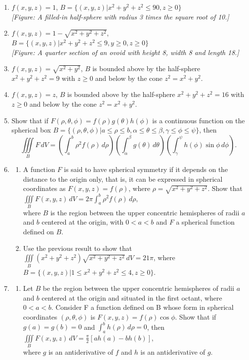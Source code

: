 \documentclass{exercises}
\begin{document}
\begin{enumerate}[resume]
\item $f(x,y,z)=1$, $B=\{(x,y,z)|x^{2}+y^{2}+z^{2}\le90,z\ge0\}$ \\ \textit{[Figure: A filled-in half-sphere with radius 3 times the square root of 10.]}
\item $f(x,y,z)=1-\sqrt{x^{2}+y^{2}+z^{2}}$, $B=\{(x,y,z)|x^{2}+y^{2}+z^{2}\le9,y\ge0,z\ge0\}$ \\ \textit{[Figure: A quarter section of an ovoid with height 8, width 8 and length 18.]}
\item $f(x,y,z)=\sqrt{x^{2}+y^{2}}$, $B$ is bounded above by the half-sphere $x^{2}+y^{2}+z^{2}=9$ with $z\ge0$ and below by the cone $z^{2}=x^{2}+y^{2}$.
\item $f(x,y,z)=z$, $B$ is bounded above by the half-sphere $x^{2}+y^{2}+z^{2}=16$ with $z\ge0$ and below by the cone $z^{2}=x^{2}+y^{2}$.
\item Show that if $F(\rho,\theta,\phi)=f(\rho)g(\theta)h(\phi)$ is a continuous function on the spherical box $B=\{(\rho,\theta,\phi)|a\le \rho \le b,\alpha \le \theta \le \beta,\gamma \le \phi \le \psi \}$, then \[\underset{B}{\iiint}F\,dV=(\int_{a}^{b}\rho^{2}f(\rho)\,d\rho)(\int_{\alpha}^{\beta}g(\theta)\,d\theta)(\int_{\gamma}^{\psi}h(\phi)\sin \phi \,d\phi).\]
\item
\begin{enumerate}[label=(\alph*)]
  \item A function $F$ is said to have spherical symmetry if it depends on the distance to the origin only, that is, it can be expressed in spherical coordinates as $F(x,y,z)=f(\rho)$, where $\rho=\sqrt{x^{2}+y^{2}+z^{2}}$. Show that\\ $\underset{B}{\iiint}F(x,y,z)\,dV=2\pi \int_{a}^{b}\rho^{2}f(\rho)\,d\rho$,\\ where $B$ is the region between the upper concentric hemispheres of radii $a$ and $b$ centered at the origin, with $0<a<b$ and $F$ a spherical function defined on $B$.
  \item Use the previous result to show that $\underset{B}{\iiint}(x^{2}+y^{2}+z^{2})\sqrt{x^{2}+y^{2}+z^{2}}\,dV=21\pi$, where\\ $B=\{(x,y,z)|1\le x^{2}+y^{2}+z^{2}\le4,z\ge0\}$.
\end{enumerate}
\item
\begin{enumerate}[label=(\alph*)]
  \item Let $B$ be the region between the upper concentric hemispheres of radii $a$ and $b$ centered at the origin and situated in the first octant, where $0<a<b$. Consider F a function defined on B whose form in spherical coordinates $(\rho,\theta,\phi)$ is $F(x,y,z)=f(\rho)\cos \phi$. Show that if $g(a)=g(b)=0$ and $\int_{a}^{b}h(\rho)\,d\rho=0$, then\\ $\underset{B}{\iiint}F(x,y,z)\,dV=\frac{\pi}{2}[ah(a)-bh(b)]$,\\ where $g$ is an antiderivative of $f$ and $h$ is an antiderivative of $g$.

\end{enumerate}
\end{enumerate}
\end{document}
